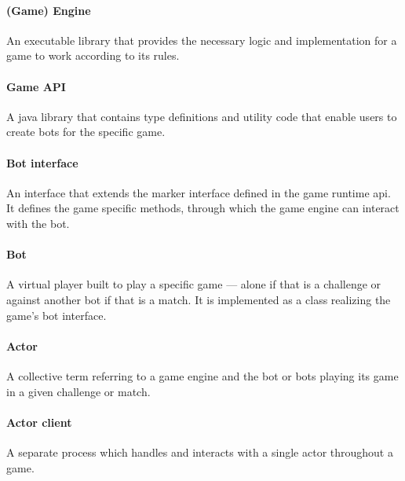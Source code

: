  	\paragraph{(Game) Engine} An executable library that provides the necessary logic and implementation for a game to work according to its rules.
  
  	\paragraph{Game API} A java library that contains type definitions and utility code that enable users to create bots for the specific game.
  
  	\paragraph{Bot interface} An interface that extends the  marker interface defined in the game runtime api. It defines the game specific methods, through which the game engine can interact with the bot. 
  	
  	\paragraph{Bot} A virtual player built to play a specific game --- alone if that is a challenge or against another bot if that is a match. It is implemented as a class realizing the game's bot interface.
    	
  	\paragraph{Actor} A collective term referring to a game engine and the bot or bots playing its game in a given challenge or match.
  
  	\paragraph{Actor client} A separate process which handles and interacts with a single actor throughout a game.
  
%